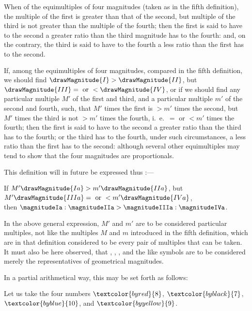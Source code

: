 \documentclass[booklanguage=english]{byrnebook}
\begin{document}
When of the equimultiples of four magnitudes (taken as in the fifth definition), the multiple of the first is greater than that of the second, but multiple of the third is not greater than the multiple of the fourth; then the first is said to have to the second a greater ratio than the third magnitude has to the fourth: and, on the contrary, the third is said to have to the fourth a less ratio than the first has to the second.

If, among the equimultiples of four magnitudes, compared in the fifth definition, we should find $\drawMagnitude{I} > \drawMagnitude{II}$, but $\drawMagnitude{III} = \mbox{ or } < \drawMagnitude{IV}$, or if we should find any particular multiple $M'$ of the first and third, and a particular multiple $m'$ of the second and fourth, such, that $M'$ times the first is $> m'$ times the second, but $M'$ times the third is not $> m'$ times the fourth, i.\ e.\ $= \mbox{ or } < m'$ times the fourth; then the first is said to have to the second a greater ratio than the third has to the fourth; or the third has to the fourth, under such circumstances, a less ratio than the first has to the second: although several other equimultiples may tend to show that the four magnitudes are proportionals.

This definition will in future be expressed thus :—

\begin{center}
If $M' \drawMagnitude{Ia} > m' \drawMagnitude{IIa}$, but $M' \drawMagnitude{IIIa} = \mbox{ or } < m' \drawMagnitude{IVa}$,\\
then $\magnitudeIa : \magnitudeIIa > \magnitudeIIIa : \magnitudeIVa$.
\end{center}

In the above general expression, $M'$ and $m'$ are to be considered particular multiples, not like the multiples $M$ and $m$ introduced in the fifth definition, which are in that definition considered to be every pair of multiples that can be taken. It must also be here observed, that \magnitudeIa, \magnitudeIIa, \magnitudeIIIa, and the like symbols are to be considered merely the representatives of geometrical magnitudes.

In a partial arithmetical way, this may be set forth as follows:

Let us take the four numbers $\textcolor{byred}{8}$, $\textcolor{byblack}{7}$, $\textcolor{byblue}{10}$, and $\textcolor{byyellow}{9}$.
\end{document}
